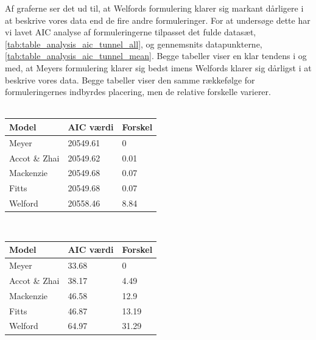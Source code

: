 Af graferne ser det ud til, at Welfords formulering klarer sig markant dårligere i at beskrive vores data end de fire andre formuleringer. For at undersøge dette har vi lavet AIC analyse af formuleringerne tilpasset det fulde datasæt, \ref{tab:table_analysis_aic_tunnel_all}, og gennemsnits datapunkterne, \ref{tab:table_analysis_aic_tunnel_mean}. Begge tabeller viser en klar tendens i og med, at Meyers formulering klarer sig bedst imens Welfords klarer sig dårligst i at beskrive vores data. Begge tabeller viser den samme rækkefølge for formuleringernes indbyrdes placering, men de relative forskelle varierer.\\\\
\begin{minipage}[t]{\linewidth} 
	\begin{minipage}[t]{0.45\linewidth}
			\begin{tabular}{lll}
				Model & AIC værdi & Forskel\\\hline
				Meyer & 20549.61 & 0 \\
				Accot \& Zhai & 20549.62 & 0.01\\
				Mackenzie & 20549.68 & 0.07 \\
				Fitts & 20549.68 & 0.07\\
				Welford & 20558.46 & 8.84
			\end{tabular}
			\label{tab:table_analysis_aic_tunnel_all}
	\end{minipage}
	\begin{minipage}[t]{0.1\linewidth}
	~
	\end{minipage}
	\begin{minipage}[t]{0.45\linewidth}
			\begin{tabular}{lll}
				Model & AIC værdi & Forskel\\\hline
				Meyer & 33.68 & 0 \\
				Accot \& Zhai & 38.17 & 4.49\\
				Mackenzie & 46.58 & 12.9 \\
				Fitts & 46.87 & 13.19\\
				Welford & 64.97 & 31.29
			\end{tabular}
			\label{tab:table_analysis_aic_tunnel_mean}
	\end{minipage}
\end{minipage}\\\\
